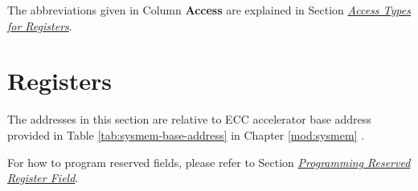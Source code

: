 \documentclass[main\_\_EN.tex]{subfiles}
\begin{document}
The abbreviations given in Column \textbf{Access} are explained in Section \hyperref[glossary-access-types]{\textit{Access Types for Registers}}.






\newpage
\section{Registers}

The addresses in this section are relative to ECC accelerator base address provided in Table \ref{tab:sysmem-base-address} in Chapter \ref{mod:sysmem} \textit{}.

For how to program reserved fields, please refer to Section \hyperref[programming-reserved-field]{\textit{Programming Reserved Register Field}}.


\end{document}
